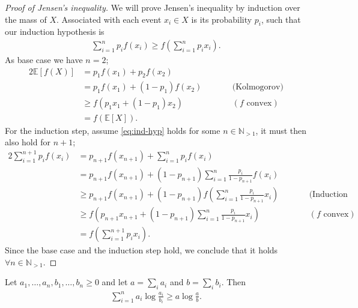 \begin{proof}[Proof of Jensen's inequality]
  We will prove Jensen's inequality by induction over the mass of $X$.
  Associated with each event $x_i \in X$ is its probability $p_i$, such that
  our induction hypothesis is
  \begin{align}\label{eq:ind-hyp}
    \sum_{i=1}^n p_i f\left(x_i\right) \geq f\left(\sum_{i=1}^n p_i x_i
    \right).
  \end{align}
  As base case we have $n=2$;
  \begin{alignat*}{2}
    \mathbb{E}\left[f(X)\right] 
      &= p_1 f(x_1) + p_2 f(x_2) \\
      &= p_1 f(x_1) + (1-p_1) f(x_2) &&\qquad{\text{(Kolmogorov)}}\\
      &\geq f(p_1x_1 + (1-p_1)x_2) &&\qquad{(f\text{ convex})}\\
      &= f(\mathbb{E}[X])
  .\end{alignat*}
  For the induction step, assume \cref{eq:ind-hyp} holds for some
  $n\in\mathbb{N}_{>1}$, it must then also hold for $n+1$;
  \begin{alignat*}{2}
    \sum_{i=1}^{n+1} p_i f(x_i) 
      &= p_{n+1} f(x_{n+1}) + \sum_{i=1}^n p_i f(x_i)\\
      &= p_{n+1} f(x_{n+1}) + (1-p_{n+1})\sum_{i=1}^n \frac{p_i}{1-p_{n+1}} f(x_i)\\
      &\geq p_{n+1} f(x_{n+1}) + (1-p_{n+1})f\left(\sum_{i=1}^n
  \frac{p_i}{1-p_{n+1}} x_i\right) &&\qquad{\text{(Induction hypothesis)}}\\
      &\geq f\left(p_{n+1}x_{n+1} + (1-p_{n+1})\sum_{i=1}^n \frac{p_i}{1-p_{n+1}} x_i\right)
      &&\qquad{(f\text{ convex})}\\
      &=f\left(\sum_{i=1}^{n+1}p_i x_i\right).
  \end{alignat*}
  Since the base case and the induction step hold, we conclude that it holds
  $\forall n \in \mathbb{N}_{>1}$.
\end{proof}
\begin{cor}\label{cor:logsum}
  Let $a_1, \ldots, a_n, b_1, \ldots, b_n \geq 0$ and let $a = \sum_i a_i$ and
  $b = \sum_i b_i$. Then
  \begin{align}\label{eq:logsum}
    \sum_{i=1}^n a_i \log \frac{a_i}{b_i} \geq a \log \frac{a}{b}
  .\end{align}
\end{cor}
